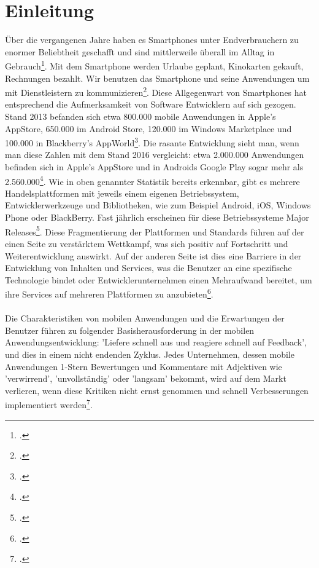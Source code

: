 \chapter{Einleitung} \label{Einleitung}

Über die vergangenen Jahre haben es Smartphones unter Endverbrauchern zu enormer Beliebtheit geschafft und sind mittlerweile überall im Alltag in Gebrauch\footcite{RealChallengesMobileApp}. Mit dem Smartphone werden Urlaube geplant, Kinokarten gekauft, Rechnungen bezahlt. Wir benutzen das Smartphone und seine Anwendungen um mit Dienstleistern zu kommunizieren\footcite{ChallOppMobAppDev}. Diese Allgegenwart von Smartphones hat entsprechend die Aufmerksamkeit von Software Entwicklern auf sich gezogen. Stand 2013 befanden sich etwa 800.000 mobile Anwendungen in Apple's AppStore, 650.000 im Android Store, 120.000 im Windows Marketplace und 100.000 in Blackberry's AppWorld\footcite{RealChallengesMobileApp}. Die rasante Entwicklung sieht man, wenn man diese Zahlen mit dem Stand 2016 vergleicht: etwa 2.000.000 Anwendungen befinden sich in Apple's AppStore und in Androids Google Play sogar mehr als 2.560.000\footcite{StatistikApps}. Wie in oben genannter Statistik bereits erkennbar, gibt es mehrere Handelsplattformen mit jeweils einem eigenen Betriebssystem, Entwicklerwerkzeuge und Bibliotheken, wie zum Beispiel Android, iOS, Windows Phone oder BlackBerry. Fast jährlich erscheinen für diese Betriebssysteme Major Releases\footcite{ChallOppMobAppDev}. Diese Fragmentierung der Plattformen und Standards führen auf der einen Seite zu verstärktem Wettkampf, was sich positiv auf Fortschritt und Weiterentwicklung auswirkt. Auf der anderen Seite ist dies eine Barriere in der Entwicklung von Inhalten und Services, was die Benutzer an eine spezifische Technologie bindet oder Entwicklerunternehmen einen Mehraufwand bereitet, um ihre Services auf mehreren Plattformen zu anzubieten\footcite{ChallMobAppDev}. 
\\
\\
Die Charakteristiken von mobilen Anwendungen und die Erwartungen der Benutzer führen zu folgender Basisherausforderung in der mobilen Anwendungsentwicklung: 'Liefere schnell aus und reagiere schnell auf Feedback', und dies in einem nicht endenden Zyklus. Jedes Unternehmen, dessen mobile Anwendungen 1-Stern Bewertungen und Kommentare mit Adjektiven  wie 'verwirrend', 'unvollständig' oder 'langsam' bekommt, wird auf dem Markt verlieren, wenn diese Kritiken nicht ernst genommen und schnell Verbesserungen implementiert werden\footcite{ChallOppMobAppDev}. 
